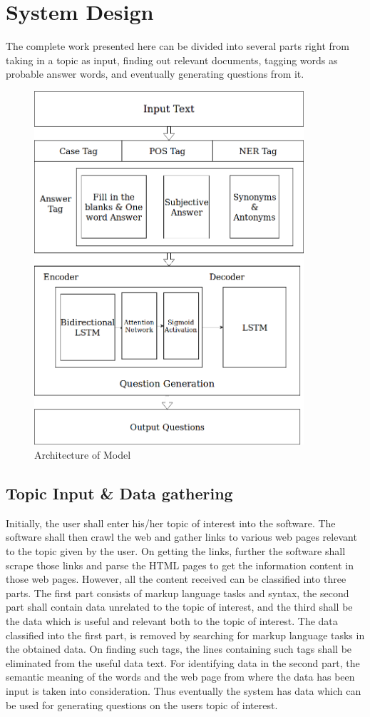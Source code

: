 \chapter{System Design}

The complete work presented here can be divided into several parts right from
taking in a topic as input, finding out relevant documents, tagging words as
probable answer words, and eventually generating questions from it.

\begin{figure}
	\caption{Architecture of Model}
	\centering\includegraphics[width=10cm]{5.png}
\end{figure}

\section{Topic Input \& Data gathering}

Initially, the user shall enter his/her topic of interest into the software. The
software shall then crawl the web and gather links to various web pages relevant
to the topic given by the user. On getting the links, further the software shall
scrape those links and parse the HTML pages to get the information content in
those web pages. 
However, all the content received can be classified into three parts. The first
part consists of markup language tasks and syntax, the second part shall contain
data unrelated to the topic of interest, and the third shall be the data which
is useful and relevant both to the topic of interest. The data classified into
the first part, is removed by searching for markup language tasks in the
obtained data. On finding such tags, the lines containing such tags shall be
eliminated from the useful data text. For identifying data in the second part,
the semantic meaning of the words and the web page from where the data has been
input is taken into consideration. Thus eventually the system has data which can
be used for generating questions on the users topic of interest. 


